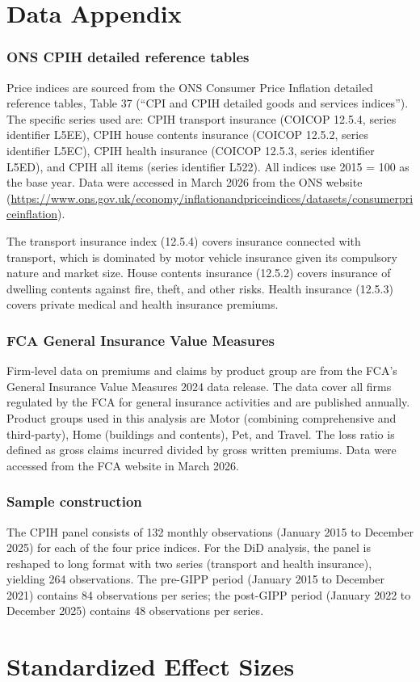 \documentclass[12pt]{article}
\begin{document}
\label{apep_main_text_end}
\newpage


\newpage
\appendix

\section{Data Appendix}

\subsubsection*{ONS CPIH detailed reference tables} Price indices are sourced from the ONS Consumer Price Inflation detailed reference tables, Table 37 (``CPI and CPIH detailed goods and services indices''). The specific series used are: CPIH transport insurance (COICOP 12.5.4, series identifier L5EE), CPIH house contents insurance (COICOP 12.5.2, series identifier L5EC), CPIH health insurance (COICOP 12.5.3, series identifier L5ED), and CPIH all items (series identifier L522). All indices use 2015 = 100 as the base year. Data were accessed in March 2026 from the ONS website (\url{https://www.ons.gov.uk/economy/inflationandpriceindices/datasets/consumerpriceinflation}).

The transport insurance index (12.5.4) covers insurance connected with transport, which is dominated by motor vehicle insurance given its compulsory nature and market size. House contents insurance (12.5.2) covers insurance of dwelling contents against fire, theft, and other risks. Health insurance (12.5.3) covers private medical and health insurance premiums.

\subsubsection*{FCA General Insurance Value Measures} Firm-level data on premiums and claims by product group are from the FCA's General Insurance Value Measures 2024 data release. The data cover all firms regulated by the FCA for general insurance activities and are published annually. Product groups used in this analysis are Motor (combining comprehensive and third-party), Home (buildings and contents), Pet, and Travel. The loss ratio is defined as gross claims incurred divided by gross written premiums. Data were accessed from the FCA website in March 2026.

\subsubsection*{Sample construction} The CPIH panel consists of 132 monthly observations (January 2015 to December 2025) for each of the four price indices. For the DiD analysis, the panel is reshaped to long format with two series (transport and health insurance), yielding 264 observations. The pre-GIPP period (January 2015 to December 2021) contains 84 observations per series; the post-GIPP period (January 2022 to December 2025) contains 48 observations per series.


\section{Standardized Effect Sizes}
\label{sec:sde}


\end{document}
